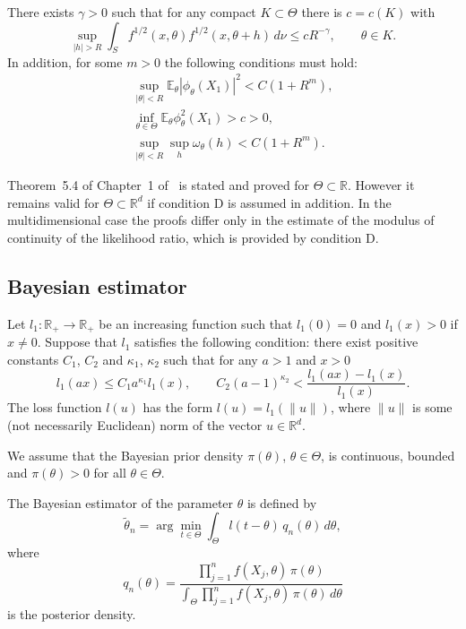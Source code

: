 \documentclass[11pt,a4paper]{article}
\begin{document}
There exists $\gamma>0$ such that for any compact $K\subset\Theta$ there is $c=c(K)$ with
\begin{equation}
\sup_{|h|>R}\int_S f^{1/2}(x,\theta)f^{1/2}(x,\theta+h)\,d\nu\le c R^{-\gamma},\qquad\theta\in K.
\label{eq:28}
\end{equation}
In addition, for some $m>0$ the following conditions must hold:
\begin{equation}
\begin{gathered}
\sup_{|\theta|<R}\mathbb{E}_\theta|\phi_\theta(X_1)|^2<C(1+R^m),\\
\inf_{\theta\in\Theta}\mathbb{E}_\theta\phi_\theta^2(X_1)>c>0,\\
\sup_{|\theta|<R}\sup_h\omega_\theta(h)<C(1+R^m).
\end{gathered}
\label{eq:29}
\end{equation}

Theorem~5.4 of Chapter~1 of~\cite{10} is stated and proved for $\Theta\subset\mathbb{R}$. However it remains valid for $\Theta\subset\mathbb{R}^d$ if condition D is assumed in addition. In the multidimensional case the proofs differ only in the estimate of the modulus of continuity of the likelihood ratio, which is provided by condition D.

\subsection{Bayesian estimator}

Let $l_1:\mathbb{R}_+\to\mathbb{R}_+$ be an increasing function such that $l_1(0)=0$ and $l_1(x)>0$ if $x\neq 0$. Suppose that $l_1$ satisfies the following condition: there exist positive constants $C_1$, $C_2$ and $\kappa_1$, $\kappa_2$ such that for any $a>1$ and $x>0$
\begin{equation}
l_1(ax)\le C_1 a^{\kappa_1}l_1(x),\qquad
C_2(a-1)^{\kappa_2}<\frac{l_1(ax)-l_1(x)}{l_1(x)}.
\label{eq:30}
\end{equation}
The loss function $l(u)$ has the form $l(u)=l_1(\|u\|)$, where $\|u\|$ is some (not necessarily Euclidean) norm of the vector $u\in\mathbb{R}^d$.

We assume that the Bayesian prior density $\pi(\theta)$, $\theta\in\Theta$, is continuous, bounded and $\pi(\theta)>0$ for all $\theta\in\Theta$.

The Bayesian estimator of the parameter $\theta$ is defined by
\begin{equation}
\tilde\theta_n=\arg\min_{t\in\Theta}\int_\Theta l(t-\theta)\,q_n(\theta)\,d\theta,
\label{eq:Bayes}
\end{equation}
where
\begin{equation}
q_n(\theta)=\frac{\prod_{j=1}^n f(X_j,\theta)\,\pi(\theta)}{\int_\Theta\prod_{j=1}^n f(X_j,\theta)\,\pi(\theta)\,d\theta}
\label{eq:posterior}
\end{equation}
is the posterior density.
\end{document}

